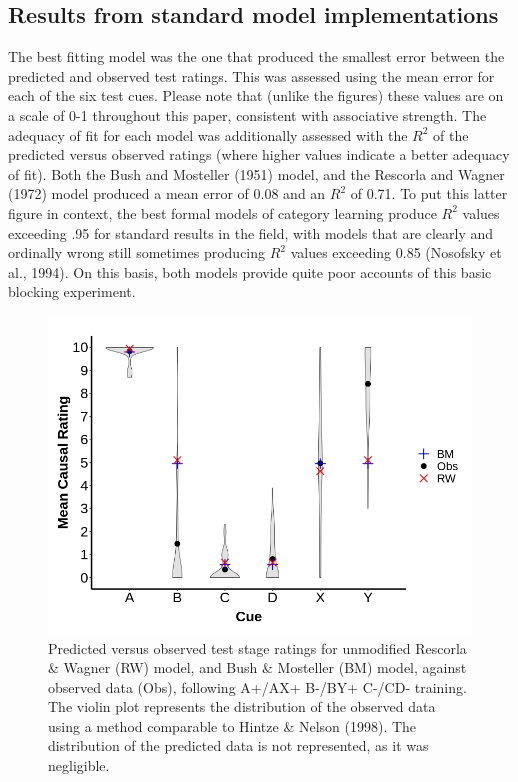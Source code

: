 \documentclass[twocolumn]{article}
\begin{document}
\subsection{Results from standard model implementations}

The best fitting model was the one that produced the smallest error between the
predicted and observed test ratings. This was assessed using the mean error for
each of the six test cues. Please note that (unlike the figures) these values
are on a scale of 0-1 throughout this paper, consistent with associative
strength. The adequacy of fit for each model was additionally assessed with the
$R^2$ of the predicted versus observed ratings (where higher values indicate a
better adequacy of fit). Both the Bush and Mosteller (1951) model, and the
Rescorla and Wagner (1972) model produced a mean error of 0.08 and an $R^2$ of
0.71. To put this latter figure in context, the best formal models of category
learning produce $R^2$ values exceeding .95 for standard results in the field,
with models that are clearly and ordinally wrong still sometimes producing
$R^2$ values exceeding 0.85 (Nosofsky et al., 1994). On this basis, both models
provide quite poor accounts of this basic blocking experiment.

\begin{figure}[t!]
\includegraphics[width=\columnwidth]{fig1.jpg}
\caption{Predicted versus observed test stage ratings for unmodified Rescorla
\& Wagner (RW) model, and Bush \& Mosteller (BM) model, against observed
data (Obs), following A+/AX+ B-/BY+ C-/CD- training. The violin plot
represents the distribution of the observed data using a method
comparable to Hintze \& Nelson (1998). The distribution of the predicted
data is not represented, as it was negligible.}
\end{figure}
\end{document}
